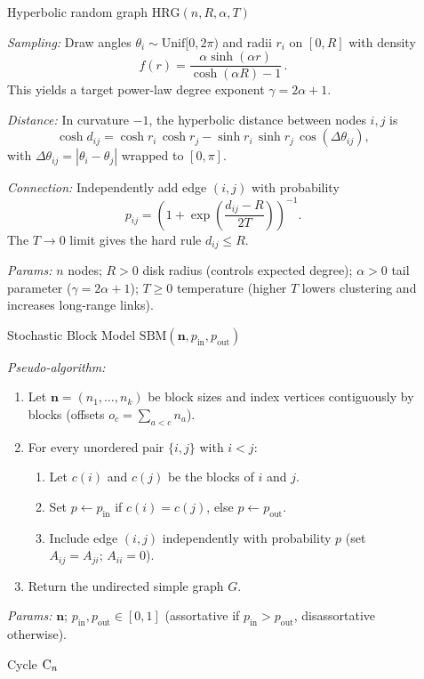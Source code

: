 \documentclass[twoside,11pt]{article}
\numberwithin{equation}{section}
\numberwithin{theorem}{section}
\numberwithin{example}{section}
\begin{document}
\begin{description}
\item[]\textsf{Hyperbolic random graph} $\mathrm{HRG}(n,R,\alpha,T)$

\emph{Sampling:} Draw angles $\theta_i\sim\mathrm{Unif}[0,2\pi)$ and radii $r_i$ on $[0,R]$ with density
\[
f(r)=\frac{\alpha\sinh(\alpha r)}{\cosh(\alpha R)-1}\,.
\]
This yields a target power-law degree exponent $\gamma=2\alpha+1$.

\emph{Distance:} In curvature $-1$, the hyperbolic distance between nodes $i,j$ is
\[
\cosh d_{ij}=\cosh r_i\,\cosh r_j-\sinh r_i\,\sinh r_j\,\cos(\Delta\theta_{ij}),
\]
with $\Delta\theta_{ij}=|\theta_i-\theta_j|$ wrapped to $[0,\pi]$.

\emph{Connection:} Independently add edge $(i,j)$ with probability
\[
p_{ij}=\left(1+\exp\left(\frac{d_{ij}-R}{2T}\right)\right)^{-1}.
\]
The $T\!\to\!0$ limit gives the hard rule $d_{ij}\le R$.

\emph{Params:} $n$ nodes; $R>0$ disk radius (controls expected degree);
$\alpha>0$ tail parameter ($\gamma=2\alpha+1$); $T\ge 0$ temperature (higher $T$ lowers clustering and increases long-range links).

\item[]\textsf{Stochastic Block Model} $\mathrm{SBM}(\mathbf n,p_{\mathrm{in}},p_{\mathrm{out}})$

 \emph{Pseudo-algorithm:}
 \begin{enumerate}
 \item Let $\mathbf n=(n_1,\dots,n_k)$ be block sizes and index vertices contiguously by blocks (offsets $o_c=\sum_{a<c}n_a$).
 \item For every unordered pair $\{i,j\}$ with $i<j$:
   \begin{enumerate}
     \item Let $c(i)$ and $c(j)$ be the blocks of $i$ and $j$.
     \item Set $p \leftarrow p_{\mathrm{in}}$ if $c(i)=c(j)$, else $p \leftarrow p_{\mathrm{out}}$.
     \item Include edge $(i,j)$ independently with probability $p$ (set $A_{ij}=A_{ji}$; $A_{ii}=0$).
   \end{enumerate}
 \item Return the undirected simple graph $G$.
 \end{enumerate}
 \emph{Params:} $\mathbf n$; $p_{\mathrm{in}},p_{\mathrm{out}}\in[0,1]$ (assortative if $p_{\mathrm{in}}>p_{\mathrm{out}}$, disassortative otherwise). 

\item[]\textsf{Cycle} ${\rm C}_n$


\end{description}
\end{document}
